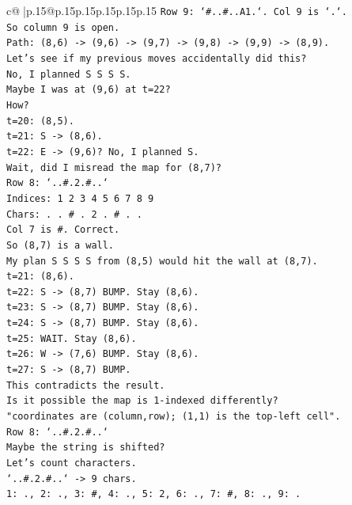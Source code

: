 \documentclass{article}
\begin{document}
{\begin{supertabular}{c@{$\;$}|p{.15\linewidth}@{}p{.15\linewidth}p{.15\linewidth}p{.15\linewidth}p{.15\linewidth}p{.15\linewidth}}
{{{\texttt{Row 9: `\#..\#..A1.`. Col 9 is `.`.} \\
\texttt{So column 9 is open.} \\
\texttt{Path: (8,6) {-}> (9,6) {-}> (9,7) {-}> (9,8) {-}> (9,9) {-}> (8,9).} \\
\texttt{Let's see if my previous moves accidentally did this?} \\
\texttt{No, I planned S S S S.} \\
\texttt{Maybe I was at (9,6) at t=22?} \\
\texttt{How?} \\
\texttt{t=20: (8,5).} \\
\texttt{t=21: S {-}> (8,6).} \\
\texttt{t=22: E {-}> (9,6)? No, I planned S.} \\
\texttt{Wait, did I misread the map for (8,7)?} \\
\texttt{Row 8: `..\#.2.\#..`} \\
\texttt{Indices: 1 2 3 4 5 6 7 8 9} \\
\texttt{Chars: . . \# . 2 . \# . .} \\
\texttt{Col 7 is \#. Correct.} \\
\texttt{So (8,7) is a wall.} \\
\texttt{My plan S S S S from (8,5) would hit the wall at (8,7).} \\
\texttt{t=21: (8,6).} \\
\texttt{t=22: S {-}> (8,7) BUMP. Stay (8,6).} \\
\texttt{t=23: S {-}> (8,7) BUMP. Stay (8,6).} \\
\texttt{t=24: S {-}> (8,7) BUMP. Stay (8,6).} \\
\texttt{t=25: WAIT. Stay (8,6).} \\
\texttt{t=26: W {-}> (7,6) BUMP. Stay (8,6).} \\
\texttt{t=27: S {-}> (8,7) BUMP.} \\
\texttt{This contradicts the result.} \\
\texttt{Is it possible the map is 1{-}indexed differently?} \\
\texttt{"coordinates are (column,row); (1,1) is the top{-}left cell".} \\
\texttt{Row 8: `..\#.2.\#..`} \\
\texttt{Maybe the string is shifted?} \\
\texttt{Let's count characters.} \\
\texttt{`..\#.2.\#..` {-}> 9 chars.} \\
\texttt{1: ., 2: ., 3: \#, 4: ., 5: 2, 6: ., 7: \#, 8: ., 9: .} \\
}}}
\end{supertabular}}
\end{document}
